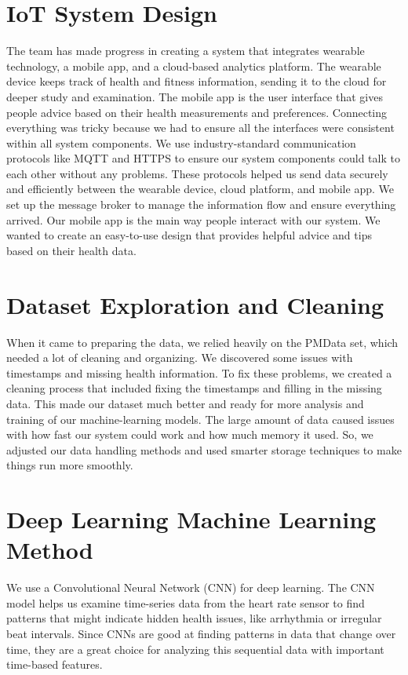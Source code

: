 \documentclass[10pt]{extarticle}
\begin{document}
\section{IoT System Design}

The team has made progress in creating a system that integrates wearable technology, a mobile app, and a cloud-based analytics platform. The wearable device keeps track of health and fitness information, sending it to the cloud for deeper study and examination. The mobile app is the user interface that gives people advice based on their health measurements and preferences. Connecting everything was tricky because we had to ensure all the interfaces were consistent within all system components. We use industry-standard communication protocols like MQTT and HTTPS to ensure our system components could talk to each other without any problems. These protocols helped us send data securely and efficiently between the wearable device, cloud platform, and mobile app. We set up the message broker to manage the information flow and ensure everything arrived. Our mobile app is the main way people interact with our system. We wanted to create an easy-to-use design that provides helpful advice and tips based on their health data.

\section{Dataset Exploration and Cleaning}

When it came to preparing the data, we relied heavily on the PMData set, which needed a lot of cleaning and organizing. We discovered some issues with timestamps and missing health information. To fix these problems, we created a cleaning process that included fixing the timestamps and filling in the missing data. This made our dataset much better and ready for more analysis and training of our machine-learning models. The large amount of data caused issues with how fast our system could work and how much memory it used. So, we adjusted our data handling methods and used smarter storage techniques to make things run more smoothly.

\section{Deep Learning Machine Learning Method}

We use a Convolutional Neural Network (CNN) for deep learning. The CNN model helps us examine time-series data from the heart rate sensor to find patterns that might indicate hidden health issues, like arrhythmia or irregular beat intervals. Since CNNs are good at finding patterns in data that change over time, they are a great choice for analyzing this sequential data with important time-based features.
\end{document}
